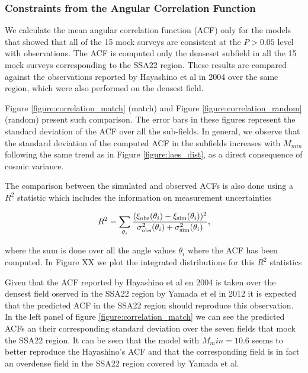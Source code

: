 \documentclass[usenatbib]{mn2e}
\begin{document}
\subsubsection{Constraints from the Angular Correlation Function}

We calculate the mean angular correlation function (ACF) only for the
models that showed that all of the 15 mock surveys are consistent
at the $P>0.05$ level with observations. The ACF is computed only the
denseset subfield in all the 15 mock surveys corresponding to the
SSA22 region. These results are compared against the observations
reported by Hayashino et al in 2004 over the same region, which were
also performed on the densest field.   

Figure \ref{figure:correlation_match} (match) and Figure
\ref{figure:correlation_random} (random) present such comparison.  The
error bars in these figures represent the standard deviation of the
ACF over all the sub-fields.  In general, we observe that the standard
deviation of the computed ACF in the subfields increases with
$M_{min}$ following the same trend as in Figure
\ref{figure:laes_dist}, as a direct consequence of cosmic variance.  


The comparison between the simulated and observed ACFs is also done using a
$R^2$ statistic which includes the information on measurement uncertainties

\begin{equation}
R^{2} = \sum_{\theta_i} \frac{(\xi_{\rm obs}(\theta_i) - \xi_{\rm
    sim}(\theta_i))^2}{\sigma_{\rm obs}^2(\theta_i) + \sigma_{\rm
    sim}^2({\theta_i})}, 
\end{equation}

where the sum is done over all the angle values $\theta_i$ where the
ACF has been computed. In Figure XX we plot the integrated
distributions for this $R^{2}$ statistics 

Given that the ACF reported by Hayashino et al en 2004 is taken over
the densest  field oserved in the SSA22 region by  Yamada et el in
2012 it is expected that the predicted ACF in the SSA22 region should
reproduce this observation. In the  left panel of figure
\ref{figure:correlation_match} we can see the predicted ACFs  an their
corresponding standard deviation over the seven fields that mock the
SSA22  region. It can be seen that the model with $M_min=10.6$ seems
to better reproduce the  Hayashino's ACF and that the corresponding
field is in fact an overdense field in the SSA22 region covered by
Yamada et al. 
\end{document}
